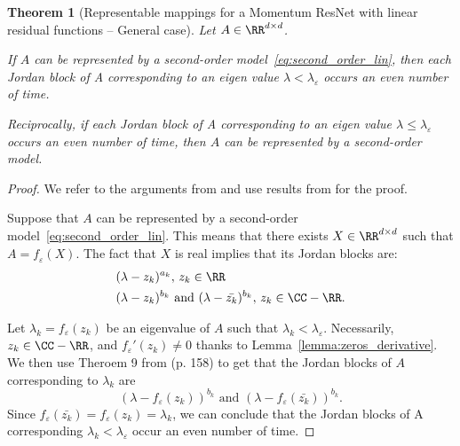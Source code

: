 \documentclass{article}
\newtheorem{theorem}{Theorem}
\begin{document}
\begin{theorem}[Representable mappings for a Momentum ResNet with linear residual functions -- General case]

Let $A \in \RR^{d \times d}$.


If $A$ can be represented by a second-order model~\eqref{eq:second_order_lin}, then each Jordan block of A corresponding to an eigen value  $\lambda < \lambda_{\varepsilon}$ occurs an even number of time.

Reciprocally, if each Jordan block of A corresponding to an eigen value  $\lambda \leq \lambda_{\varepsilon}$ occurs an even number of time, then $A$ can be represented by a second-order model. 
\end{theorem}
\begin{proof}


We refer to the arguments from \citet{culver1966existence} and use results from \citet{gant} for the proof. 

Suppose that $A$ can be represented by a second-order model~\eqref{eq:second_order_lin}. This means that there exists $X \in \RR^{d\times d}$ such that $\mathit{A = f_{\varepsilon}(X)}$. The fact that $X$ is real implies that its Jordan blocks are:
\begin{equation*}
    \begin{split}
        &(\lambda - z_k)^{a_k}  ,\, z_k \in \RR \\
         &(\lambda - z_k)^{b_k} \text{ and } (\lambda - \bar{z_k})^{b_k} , \, z_k \in \CC -\RR .
    \end{split}
\end{equation*}

Let $\lambda_k = f_{\varepsilon}(z_k)$ be an eigenvalue of $A$ such that $\lambda_k < \lambda_{\varepsilon}$. Necessarily, $z_k \in \CC -\RR$, and $f_{\varepsilon}'(z_k) \neq 0$ thanks to Lemma~\ref{lemma:zeros_derivative}. We then use Theroem 9 from \citet{gant} (p. 158) to get that the Jordan blocks of $A$ corresponding to  $\lambda_k$ are 
\begin{equation*}
         (\lambda - f_{\varepsilon}(z_k))^{b_k} \text{ and } (\lambda - f_{\varepsilon}(\bar{z_k}))^{b_k}.
\end{equation*}
 Since  $f_{\varepsilon}(\bar{z_k}) = f_{\varepsilon}(z_k) = \lambda_k$, we can conclude that the Jordan blocks of A corresponding $\lambda_k < \lambda_{\varepsilon}$ occur an even number of time.


\end{proof}
\end{document}
